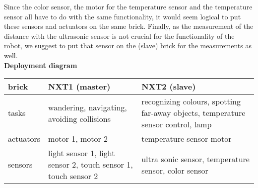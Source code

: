 \documentclass[11pt,a4paper]{article}
\begin{document}
Since the color sensor, the motor for the temperature sensor and the temperature sensor all have to do with the same functionality, it would seem logical to put these sensors and actuators on the same brick. Finally, as the measurement of the distance with the ultrasonic sensor is not crucial for the functionality of the robot, we suggest to put that sensor on the (slave) brick for the measurements as well.\\

\textbf{Deployment diagram}\\
\begin{tabular}{|p{3cm}|p{6cm}|p{6cm}|} 
\hline
\textbf{brick} & \textbf{NXT1 (master)} & \textbf{NXT2 (slave)}\\
\hline
tasks & wandering, navigating, avoiding collisions & recognizing colours, spotting far-away objects, temperature sensor control, lamp\\\hline
actuators & motor 1, motor 2 & temperature sensor motor\\\hline
sensors & light sensor 1, light sensor 2, touch sensor 1, touch sensor 2 & ultra sonic sensor, temperature sensor, color sensor\\
\hline
\end{tabular}
\end{document}

